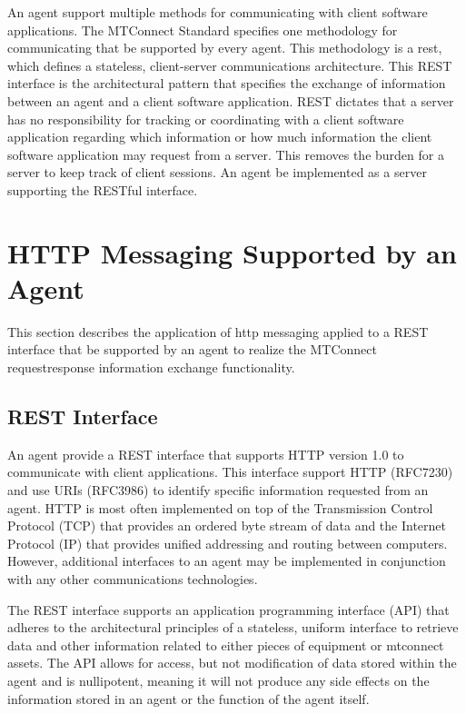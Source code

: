 \documentclass{mtconnect}	%
\begin{document}
An \gls{agent} \MAY support multiple methods for communicating with client software applications.  The MTConnect Standard specifies one methodology for communicating that \MUST be supported by every \gls{agent}.  This methodology is a \gls{rest}, which defines a stateless, client-server communications architecture.  This REST interface is the architectural pattern that specifies the exchange of information between an \gls{agent} and a client software application.  REST dictates that a server has no responsibility for tracking or coordinating with a client software application regarding which information or how much information the client software application may request from a server.  This removes the burden for a server to keep track of client sessions.  An \gls{agent} \MUST be implemented as a server supporting the RESTful interface. 

\section{HTTP Messaging Supported by an Agent}

This section describes the application of \gls{http messaging} applied to a REST interface that \MUST be supported by an \gls{agent} to realize the MTConnect \gls{requestresponse} information exchange functionality.

\subsection{REST Interface}

An \gls{agent} \MUST provide a REST interface that supports HTTP version 1.0 to communicate with client applications.  This interface \MUST support HTTP (RFC7230) and use URIs (RFC3986) to identify specific information requested from an \gls{agent}.  HTTP is most often implemented on top of the Transmission Control Protocol (TCP) that provides an ordered byte stream of data and the Internet Protocol (IP) that provides unified addressing and routing between computers.  However, additional interfaces to an \gls{agent} may be implemented in conjunction with any other communications technologies.

The REST interface supports an \gls{application programming interface} (API) that adheres to the architectural principles of a stateless, uniform interface to retrieve data and other information related to either pieces of equipment or \glspl{mtconnect asset}.  The API allows for access, but not modification of data stored within the \gls{agent} and is nullipotent, meaning it will not produce any side effects on the information stored in an \gls{agent} or the function of the \gls{agent} itself.
\end{document}
